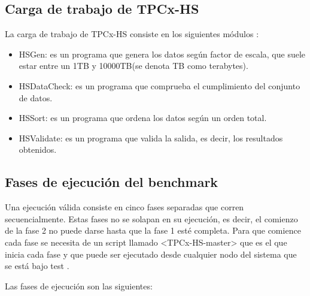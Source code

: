 \documentclass[10pt]{article}
\begin{document}
	\subsection{Carga de trabajo de TPCx-HS}
	
		La carga de trabajo de TPCx-HS consiste en los siguientes módulos \cite{tpcxhs}:
		
		\begin{itemize}
			\item HSGen: es un programa que genera los datos según factor de escala, que suele estar entre un 1TB y 10000TB(se denota TB como terabytes).
			\item HSDataCheck: es un programa que comprueba el cumplimiento del conjunto de datos.
			\item HSSort: es un programa que ordena los datos según un orden total.
			\item HSValidate: es un programa que valida la salida, es decir, los resultados obtenidos.
		\end{itemize}
	
	\subsection{Fases de ejecución del benchmark}
	
		Una ejecución válida consiste en cinco fases separadas que corren secuencialmente. Estas fases no se solapan en su ejecución, es decir, el comienzo de la fase 2 no puede darse hasta que la fase 1 esté completa. Para que comience cada fase se necesita de un script llamado <TPCx-HS-master> que es el que inicia cada fase y que puede ser ejecutado desde cualquier nodo del sistema que se está bajo test \cite{tpcxhs}.
		
		Las fases de ejecución son las siguientes:
		
\end{document}
